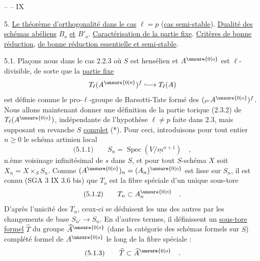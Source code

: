 
\hfill --  -- \hfill IX

5. \uline{Le théorème d'orthogonalité dans le cas} $\ell=p$ (\uline{cas semi-stable}). \uline{Dualité des schémas abéliens} $B_o$ \uline{et} $B'_o$. \uline{Caractérisation de la partie fixe}. \uline{Critères de bonne réduction}, \uline{de bonne réduction essentielle et semi-stable}.

5.1. Plaçons nous dans le cas 2.2.3 où $S$ est hensélien et $A^{\unsure{0|o}}$ est $\ell$-divisible, de sorte que la \uline{partie fixe}
\[
T_\ell(A^{\unsure{0|o}})^f\lhook\joinrel\longrightarrow T_\ell(A)
\]
est définie comme le pro-$\ell$-groupe de Barsotti-Tate formé des $({}_{\ell^\nu}A^{\unsure{0|o}})^f$.
Nous allons maintenant donner une définition de la partie torique (2.3.2) de $T_\ell(A^{\unsure{0|o}})$, indépendante de l'hypothèse $\ell\neq p$ faite dans 2.3, mais supposant en revanche $S$ \uline{complet} (*). Pour ceci, introduisons pour tout entier $n\geq0$ le schéma artinien local
\[
\text{(5.1.1)}\qquad S_n=\operatorname{Spec}(V/\underline m^{n+1})\quad ,
\]
n.ème voisinage infinitésimal de $s$ dans $S$, et pour tout $S$-schéma $X$ soit $X_n=X\times_S S_n$. Comme $(A^{\unsure{0|o}})_n=(A_n)^{\unsure{0|o}}$ est lisse sur $S_n$, il est connu (SGA 3 IX 3.6 bis) que $T_o$ est la fibre spéciale d'un unique sous-tore
\[
\text{(5.1.2)}\qquad T_n\subset A_n^{\unsure{0|o}}\quad .
\]
D'après l'unicité des $T_n$, ceux-ci se déduisent les uns des autres par les changements de base $S_{n'}\longrightarrow S_n$. En d'autres termes, il définissent un \uline{sous-tore formel} $\widehat T$ du groupe $\widehat A^{\unsure{0|o}}$ (dans la catégorie des schémas formels sur $S$) complété formel de $A^{\unsure{0|o}}$ le long de la fibre spéciale :
\[
\text{(5.1.3)}\qquad\widehat T\subset\widehat A^{\unsure{0|o}}\quad .
\]

